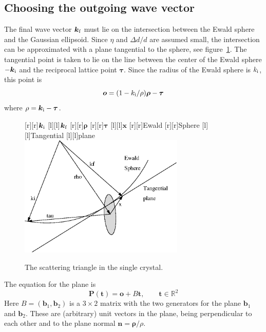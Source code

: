 \subsection{Choosing the outgoing wave vector}

The final wave vector $\boldsymbol{k}_{\rm f}$ must lie on the
intersection between the Ewald sphere and the Gaussian ellipsoid. Since
$\eta$ and $\Delta d/d$ are assumed small, the intersection can be
approximated with a plane tangential to the sphere, see
figure~\ref{fig:crystal-scattering-tri}. The tangential point is taken
to lie on the line between the center of the Ewald sphere
$-\boldsymbol{k}_{\rm i}$ and the reciprocal lattice point
$\boldsymbol{\tau}$. Since the radius of the Ewald sphere is $k_{\rm
  i}$, this point is
$$ \boldsymbol{o}=(1 - k_{\rm i}/\rho)\boldsymbol{\rho} - \boldsymbol{\tau} $$
where $\rho = \boldsymbol{k}_{\rm i} - \boldsymbol{\tau}$.
\begin{figure}[t]
  \begin{center}
    [r][r]{$\boldsymbol{k}_{\rm i}$}
    [l][l]{$\boldsymbol{k}_{\rm f}$}
    [r][r]{$\boldsymbol{\rho}$}
    [r][r]{$\boldsymbol{\tau}$}
    [l][l]{$\boldsymbol{x}$}
    [r][r]{Ewald}
    [r][r]{Sphere}
    [l][l]{Tangential}
    [l][l]{plane}
    \includegraphics[width=0.7\textwidth]{figures/recip-detail.eps}
  \end{center}
\caption{The scattering triangle in the single crystal.}
\label{fig:crystal-scattering-tri}
\end{figure}

The equation for the plane is
\begin{equation}
  \label{eq:crystal-tangent-plane}
    \boldsymbol{P}(\boldsymbol{t}) = \boldsymbol{o} + B \boldsymbol{t}, \qquad
    \boldsymbol{t} \in \mathbb{R}^2
\end{equation}
Here $B = (\boldsymbol{b}_1, \boldsymbol{b}_2)$ is a $3\times 2$ matrix
with the two generators for the plane $\boldsymbol{b}_1$ and
$\boldsymbol{b}_2$. These are (arbitrary) unit vectors in the plane,
being perpendicular to
each other and to the plane normal $\boldsymbol{n} =
\boldsymbol{\rho}/\rho$.


